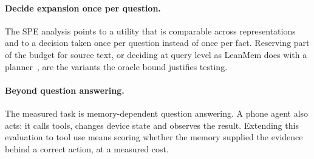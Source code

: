 \paragraph{Decide expansion once per question.}
The SPE analysis points to a utility that is comparable across representations and to a decision
taken once per question instead of once per fact. Reserving part of the budget for source text, or
deciding at query level as LeanMem does with a planner~\citep{leanmem}, are the variants the oracle
bound justifies testing.

\paragraph{Beyond question answering.}
The measured task is memory-dependent question answering. A phone agent also acts: it calls tools,
changes device state and observes the result. Extending this evaluation to tool use means scoring
whether the memory supplied the evidence behind a correct action, at a measured cost.
